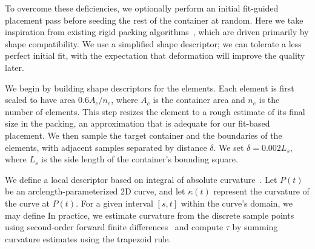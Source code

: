 To overcome these deficiencies, we optionally perform an initial fit-guided
placement pass before seeding the rest of the container at random. 
Here we take inspiration from existing rigid packing 
algorithms~\cite{Kwan2016}, which are driven primarily by shape 
compatibility.  We use a simplified shape descriptor; we can tolerate
a less perfect initial fit, with the expectation that deformation will
improve the quality later.

We begin by building shape descriptors for the elements.  
Each element is first scaled to have area
$0.6A_c/n_e$, where $A_c$ is the container area and $n_e$ is the 
number of elements.  This step resizes the element to a rough estimate
of its final size in the packing, an approximation that is adequate
for our fit-based placement.  We then sample the target container and
the boundaries of the elements, with adjacent samples separated by
distance $\delta$.  We set $\delta=0.002L_s$, where $L_s$ is the
side length of the container's bounding square.

We define a local descriptor based on integral of absolute curvature~\cite{Cui2009,Kwan2016}.
Let $P(t)$ be an arclength-parameterized 2D curve, and let $\kappa(t)$ represent the curvature of the curve at $P(t)$.  For a given interval $[s,t]$ within the curve's domain, we may define 
In practice, we estimate curvature from the discrete sample points
using second-order forward finite differences~\cite{Banchoff2015} 
and compute $\tau$ by summing curvature estimates using the trapezoid rule.

